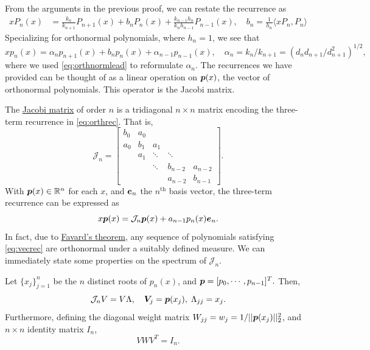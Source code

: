 From the arguments in the previous proof, we can restate the recurrence as
\begin{align}\label{eq:ogrec}
xP_n(x) &= \frac{k_n}{k_{n+1}}P_{n+1}(x) + b_nP_n(x) + \frac{k_{n-1}h_n}{k_nh_{n-1}}P_{n-1}(x), \quad b_n = \frac{1}{h_n}\big\langle xP_n,P_n\big\rangle 
\end{align}
Specializing for orthonormal polynomials, where $h_n=1$, we see that 
\begin{equation}\label{eq:orthrec}
xp_n(x) = \alpha_np_{n+1}(x) + b_np_n(x) + \alpha_{n-1}p_{n-1}(x),\quad \alpha_n=k_n/k_{n+1} = (d_nd_{n+1}/d_{n+1}^2)^{1/2},
\end{equation}
where we used \eqref{eq:orthnormlead} to reformulate $\alpha_n$. 
The recurrences we have provided can be thought of as a linear operation on $\boldsymbol{p}(x)$, the vector of orthonormal polynomials. This operator is the Jacobi matrix.
\begin{definition}\normalfont
The \underline{Jacobi matrix} of order $n$ is a tridiagonal $n\times n$ matrix encoding the three-term recurrence in \eqref{eq:orthrec}. That is,
\begin{equation}\label{eq:jacobimat}
\mathcal{J}_n = \begin{bmatrix}
b_0 & a_0 & & &\\
a_0 & b_1 & a_1 & & \\
& a_1 & \ddots & \ddots & \\
& & \ddots & b_{n-2} & a_{n-2}\\
& & & a_{n-2} & b_{n-1}
\end{bmatrix}.
\end{equation}
With $\boldsymbol{p}(x) \in \mathbb{R}^{n}$ for each $x$, and $\boldsymbol{e}_n$ the $n^{\text{th}}$ basis vector, the three-term recurrence can be expressed as
\begin{equation}\label{eq:vecrec}
x\boldsymbol{p}(x) = \mathcal{J}_n\boldsymbol{p}(x) + a_{n-1}p_{n}(x)\boldsymbol{e}_{n}.
\end{equation} 
In  fact, due to \underline{Favard's theorem}, any sequence of polynomials satisfying \eqref{eq:vecrec} are orthonormal under a suitably defined measure. We can immediately state some properties on the spectrum of $\mathcal{J}_n$.
\end{definition}
\begin{theorem}\normalfont
Let $\{x_j\}_{j=1}^n$ be the $n$ distinct roots of $p_n(x)$, and $\boldsymbol{p} = [p_0,\cdots,p_{n-1}]^T.$ Then, 
\begin{equation} 
\mathcal{J}_nV = V\Lambda,\quad \boldsymbol{V}_j = \boldsymbol{p}(x_j),\; \Lambda_{jj} = x_j.
\end{equation}
Furthermore, defining the diagonal weight matrix $W_{jj} = w_j = 1/||\boldsymbol{p}(x_j)||_2^2$, and $n\times n$ identity matrix $I_n$,
\begin{equation}\label{eq:quadrec}
VWV^T = I_n.
\end{equation}
\end{theorem}
